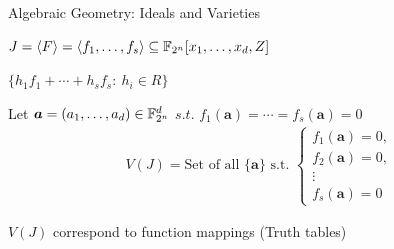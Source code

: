 
\begin{frame}{\large Algebraic Geometry: Ideals and Varieties}
\bi
	\item $J = \langle F \rangle = \langle f_1, \dots, f_s \rangle \subseteq {\mathbb{F}}_{2^n}[x_1,\dots,x_d,Z] $
	\bi
		\item $\{h_1f_1 + \cdots + h_sf_s:~h_i \in R\}$
	\ei
	\vspace{0.1in}
	\pause
	\item Let $\bm{a} = (a_1,\dots,a_d) \in {\mathbb{F}}_{2^n}^d$ $s.t.$ $f_1(\bm{a}) = \cdots = f_s(\bm{a})=0$
\ei
\begin{align*}
V(J) = \text{Set of all }\{\bm{a}\} \text{ s.t. }\begin{cases}
f_1(\bm{a}) = 0, \\
f_2(\bm{a}) = 0, \\
\vdots \\
f_s(\bm{a}) = 0
\end{cases}
\end{align*}
\pause
\bi
\item $V(J)$ correspond to function mappings (Truth tables)
\ei
\end{frame}

